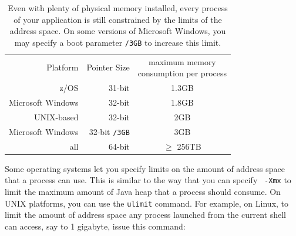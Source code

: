 \begin{table}
\centering
\begin{tabular}{rrc}
\toprule
Platform & Pointer Size & \shortstack{maximum memory\\consumption per process}
\\ \cmidrule(r){1-2} \cmidrule(l){3-3}
z/OS & 31-bit & 1.3GB \\
Microsoft Windows & 32-bit & 1.8GB \\
UNIX-based & 32-bit & 2GB \\
Microsoft Windows & 32-bit {\tt /3GB} & 3GB \\
all & 64-bit & $\ge$ 256TB \\
\bottomrule
\end{tabular}
\caption{Even with plenty of physical memory installed, every process of your
application is still constrained 
  by the limits of the address space. On some versions of Microsoft Windows, you
  may specify a boot parameter {\tt /3GB} to increase this limit.}
\label{tab:address-space-limits}
\end{table}

Some operating systems let you specify limits on the amount of address space
that a process can use. This is similar to the way that you can specify {\tt
-Xmx} to limit the maximum amount of Java heap that a process should consume. On
UNIX platforms, you can use the {\tt ulimit} command. For example, on Linux, to
limit the amount of address space any process launched from the current shell
can access, say to 1 gigabyte, issue this command:
\begin{shortlisting}
\end{shortlisting}

